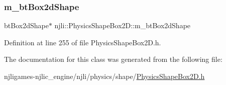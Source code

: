 \subsubsection{\texorpdfstring{m\+\_\+bt\+Box2d\+Shape}{m\_btBox2dShape}}
{\footnotesize\ttfamily bt\+Box2d\+Shape$\ast$ njli\+::\+Physics\+Shape\+Box2\+D\+::m\+\_\+bt\+Box2d\+Shape\hspace{0.3cm}{\ttfamily [private]}}



Definition at line 255 of file Physics\+Shape\+Box2\+D.\+h.



The documentation for this class was generated from the following file\+:\begin{DoxyCompactItemize}
\item 
njligames-\/njlic\+\_\+engine/njli/physics/shape/\mbox{\hyperlink{_physics_shape_box2_d_8h}{Physics\+Shape\+Box2\+D.\+h}}\end{DoxyCompactItemize}
